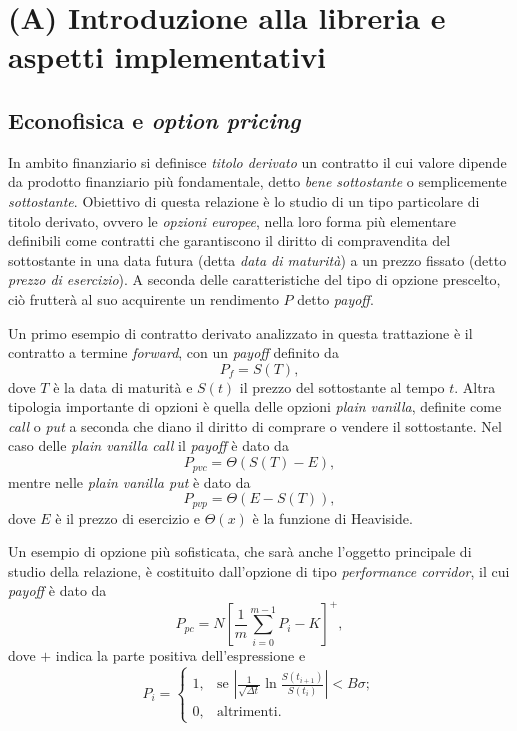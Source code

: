 \chapter{(A) Introduzione alla libreria e aspetti implementativi}
\section{Econofisica e \textit{option pricing}} \label{sec:introduction_econophysic_option_pricing}
In ambito finanziario si definisce \textit{titolo derivato} un contratto il cui valore dipende da prodotto finanziario più fondamentale, detto \textit{bene sottostante} o semplicemente \textit{sottostante}. Obiettivo di questa relazione è lo studio di un tipo particolare di titolo derivato, ovvero le \textit{opzioni europee}, nella loro forma più elementare definibili come contratti che garantiscono il diritto di compravendita del sottostante in una data futura (detta \textit{data di maturità}) a un prezzo fissato (detto \textit{prezzo di esercizio}). A seconda delle caratteristiche del tipo di opzione prescelto, ciò frutterà al suo acquirente un rendimento $P$ detto \textit{payoff}.

Un primo esempio di contratto derivato analizzato in questa trattazione è il contratto a termine \textit{forward}, con un \textit{payoff} definito da
\begin{equation}
    P_f = S(T),
    \label{eq:forward_payoff}
\end{equation}
dove $T$ è la data di maturità e $S(t)$ il prezzo del sottostante al tempo $t$. Altra tipologia importante di opzioni è quella delle opzioni \textit{plain vanilla}, definite come \textit{call} o \textit{put} a seconda che diano il diritto di comprare o vendere il sottostante. Nel caso delle \textit{plain vanilla call} il \textit{payoff} è dato da
\begin{equation}
    P_{pvc} = \Theta(S(T)-E),
    \label{eq:pvc_payoff}
\end{equation}
mentre nelle \textit{plain vanilla put} è dato da
\begin{equation}
    P_{pvp} = \Theta(E-S(T)),
    \label{eq:pvp_payoff}
\end{equation}
dove $E$ è il prezzo di esercizio e $\Theta(x)$ è la funzione di Heaviside.

Un esempio di opzione più sofisticata, che sarà anche l'oggetto principale di studio della relazione, è costituito dall'opzione di tipo \textit{performance corridor}, il cui \textit{payoff} è dato da
\begin{equation}
    P_{pc} = N\left[ \frac{1}{m} \sum_{i=0}^{m-1}{P_i} - K \right]^+,
    \label{eq:performancecorridor_payoff}
\end{equation}
dove $+$ indica la parte positiva dell'espressione e
\begin{equation}
    P_i = \begin{cases}
    1, & \text{se} \,\,\left| \frac{1}{\sqrt{\Delta t}} \ln{\frac{S(t_{i+1})}{S(t_i)}} \right| < B \sigma;\\
    0, & \text{altrimenti}.
  \end{cases}
    \label{eq:performancecorridor_barrier}
\end{equation}

